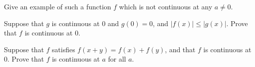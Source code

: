 \documentclass[12pt,letterpaper]{hmcpset}
\newcommand{\paren}[1]{\left(#1\right)}
\newcommand{\abs}[1]{\left|#1\right|}
\begin{document}
\begin{problem}[6.3.b]
    Give an example of such a function $f$ which is not continuous at any $a \ne 0$.
\end{problem}

\begin{solution}

\end{solution}
\newpage

\begin{problem}[6.3.c]
    Suppose that $g$ is continuous at $0$ and $g\paren{0} = 0$, and $\abs{f\paren{x}} \le \abs{g\paren{x}}$. Prove that $f$ is continuous at 0.
\end{problem}

\begin{solution}

\end{solution}
\newpage

\begin{problem}[6.7]
    Suppose that $f$ satisfies $f\paren{x+y} = f\paren{x} + f\paren{y}$, and that $f$ is continuous at $0$. Prove that $f$ is continuous at $a$ for all $a$.    
\end{problem}

\begin{solution}

\end{solution}
\newpage
\end{document}
